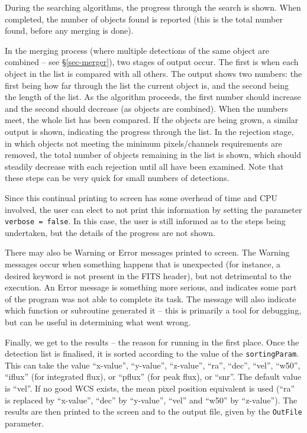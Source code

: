 During the searching algorithms, the progress through the search is
shown. When completed, the number of objects found is reported (this
is the total number found, before any merging is done).

In the merging process (where multiple detections of the same object
are combined -- see \S\ref{sec-merger}), two stages of output
occur. The first is when each object in the list is compared with all
others. The output shows two numbers: the first being how far through
the list the current object is, and the second being the length of the
list. As the algorithm proceeds, the first number should increase and
the second should decrease (as objects are combined). When the numbers
meet, the whole list has been compared. If the objects are being
grown, a similar output is shown, indicating the progress through the
list. In the rejection stage, in which objects not meeting the minimum
pixels/channels requirements are removed, the total number of objects
remaining in the list is shown, which should steadily decrease with
each rejection until all have been examined. Note that these steps can
be very quick for small numbers of detections.

Since this continual printing to screen has some overhead of time and
CPU involved, the user can elect to not print this information by
setting the parameter \texttt{verbose = false}. In this case, the user
is still informed as to the steps being undertaken, but the details of
the progress are not shown.

There may also be Warning or Error messages printed to screen. The
Warning messages occur when something happens that is unexpected (for
instance, a desired keyword is not present in the FITS header), but
not detrimental to the execution. An Error message is something more
serious, and indicates some part of the program was not able to
complete its task. The message will also indicate which function or
subroutine generated it -- this is primarily a tool for debugging, but
can be useful in determining what went wrong.


\label{sec-results}

Finally, we get to the results -- the reason for running \duchamp in
the first place. Once the detection list is finalised, it is sorted
according to the value of the \texttt{sortingParam}. This can take the
value ``x-value'', ``y-value'', ``z-value'', ``ra'', ``dec'', ``vel'',
``w50'', ``iflux'' (for integrated flux), or ``pflux'' (for peak
flux), or ``snr''. The default value is ``vel''. If no good WCS
exists, the mean pixel position equivalent is used (``ra'' is replaced
by ``x-value'', ``dec'' by ``y-value'', ``vel'' and ``w50'' by
``z-value''). The results are then printed to the screen and to the
output file, given by the \texttt{OutFile} parameter.

